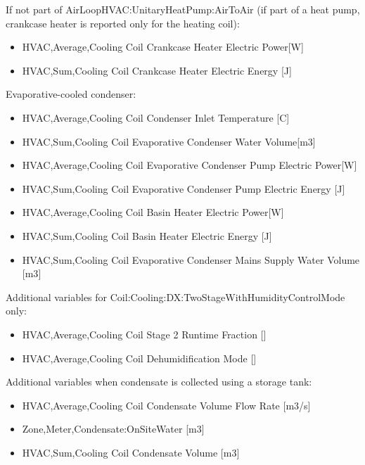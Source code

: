 If not part of AirLoopHVAC:UnitaryHeatPump:AirToAir (if part of a heat pump, crankcase heater is reported only for the heating coil):

\begin{itemize}
\item
  HVAC,Average,Cooling Coil Crankcase Heater Electric Power{[}W{]}
\item
  HVAC,Sum,Cooling Coil Crankcase Heater Electric Energy {[}J{]}
\end{itemize}

Evaporative-cooled condenser:

\begin{itemize}
\item
  HVAC,Average,Cooling Coil Condenser Inlet Temperature {[}C{]}
\item
  HVAC,Sum,Cooling Coil Evaporative Condenser Water Volume{[}m3{]}
\item
  HVAC,Average,Cooling Coil Evaporative Condenser Pump Electric Power{[}W{]}
\item
  HVAC,Sum,Cooling Coil Evaporative Condenser Pump Electric Energy {[}J{]}
\item
  HVAC,Average,Cooling Coil Basin Heater Electric Power{[}W{]}
\item
  HVAC,Sum,Cooling Coil Basin Heater Electric Energy {[}J{]}
\item
  HVAC,Sum,Cooling Coil Evaporative Condenser Mains Supply Water Volume {[}m3{]}
\end{itemize}

Additional variables for Coil:Cooling:DX:TwoStageWithHumidityControlMode only:

\begin{itemize}
\item
  HVAC,Average,Cooling Coil Stage 2 Runtime Fraction {[]}
\item
  HVAC,Average,Cooling Coil Dehumidification Mode {[]}
\end{itemize}

Additional variables when condensate is collected using a storage tank:

\begin{itemize}
\item
  HVAC,Average,Cooling Coil Condensate Volume Flow Rate {[}m3/s{]}
\item
  Zone,Meter,Condensate:OnSiteWater {[}m3{]}
\item
  HVAC,Sum,Cooling Coil Condensate Volume {[}m3{]}
\end{itemize}


